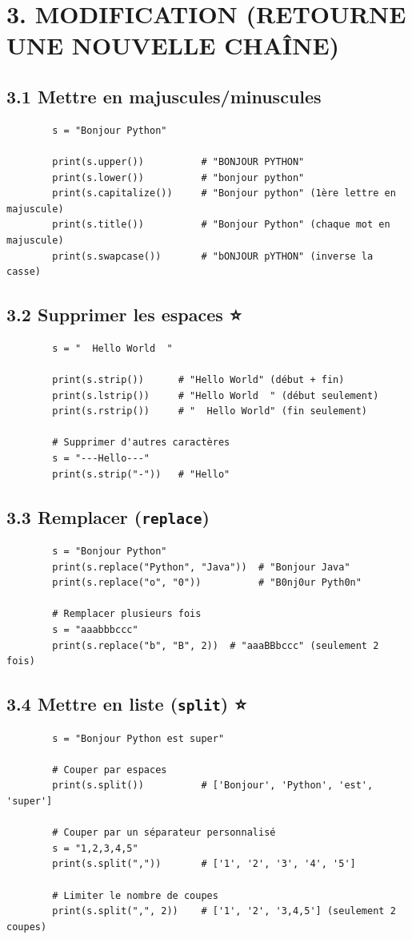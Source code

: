 \documentclass[12pt,a4paper]{article}
\begin{document}
	\section*{\color{orange}3. MODIFICATION (RETOURNE UNE NOUVELLE CHAÎNE)}
	
	\subsection*{\color{cyan}3.1 Mettre en majuscules/minuscules}
	\begin{lstlisting}
		s = "Bonjour Python"
		
		print(s.upper())          # "BONJOUR PYTHON"
		print(s.lower())          # "bonjour python"
		print(s.capitalize())     # "Bonjour python" (1ère lettre en majuscule)
		print(s.title())          # "Bonjour Python" (chaque mot en majuscule)
		print(s.swapcase())       # "bONJOUR pYTHON" (inverse la casse)
	\end{lstlisting}
	
	\subsection*{\color{cyan}3.2 Supprimer les espaces ⭐}
	\begin{lstlisting}
		s = "  Hello World  "
		
		print(s.strip())      # "Hello World" (début + fin)
		print(s.lstrip())     # "Hello World  " (début seulement)
		print(s.rstrip())     # "  Hello World" (fin seulement)
		
		# Supprimer d'autres caractères
		s = "---Hello---"
		print(s.strip("-"))   # "Hello"
	\end{lstlisting}
	
	\subsection*{\color{cyan}3.3 Remplacer (\texttt{replace})}
	\begin{lstlisting}
		s = "Bonjour Python"
		print(s.replace("Python", "Java"))  # "Bonjour Java"
		print(s.replace("o", "0"))          # "B0nj0ur Pyth0n"
		
		# Remplacer plusieurs fois
		s = "aaabbbccc"
		print(s.replace("b", "B", 2))  # "aaaBBbccc" (seulement 2 fois)
	\end{lstlisting}
	
	\subsection*{\color{cyan}3.4 Mettre en liste (\texttt{split}) ⭐}
	\begin{lstlisting}
		s = "Bonjour Python est super"
		
		# Couper par espaces
		print(s.split())          # ['Bonjour', 'Python', 'est', 'super']
		
		# Couper par un séparateur personnalisé
		s = "1,2,3,4,5"
		print(s.split(","))       # ['1', '2', '3', '4', '5']
		
		# Limiter le nombre de coupes
		print(s.split(",", 2))    # ['1', '2', '3,4,5'] (seulement 2 coupes)
	\end{lstlisting}
	
\end{document}
